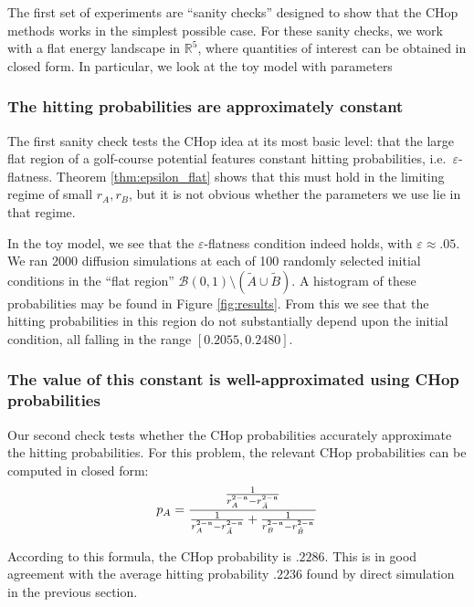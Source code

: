 \documentclass[english, aip, jcp, priprint, graphicx,floatfix]{revtex4-1}
\theoremstyle{plain}
\theoremstyle{definition}
\theoremstyle{plain}
\begin{document}
The first set of experiments are ``sanity checks'' designed to show that the CHop methods works in the simplest possible case.  For these sanity checks, we work with a flat energy landscape in $\mathbb{R}^5$, where quantities of interest can be obtained in closed form.  In particular, we look at the toy model with parameters \TODOTHIS

\subsubsection{The hitting probabilities are approximately constant}

The first sanity check tests the CHop idea at its most basic level: that the large flat region of a golf-course potential features constant hitting probabilities, i.e.\ $\varepsilon$-flatness.  Theorem \ref{thm:epsilon_flat} shows that this must hold in the limiting regime of small $r_A,r_B$, but it is not obvious whether the parameters we use lie in that regime.  

In the toy model, we see that the $\varepsilon$-flatness condition indeed holds, with $\varepsilon \approx .05$.  We ran 2000 diffusion simulations at each of 100 randomly selected initial conditions in the ``flat region'' $\mathcal{B}(0, 1) \setminus (\tilde{A} \cup \tilde{B})$.  A histogram of these probabilities may be found in Figure \ref{fig:results}.  From this we see that the hitting probabilities in this region do not substantially depend upon the initial condition, all falling in the range $[0.2055, 0.2480]$.


\subsubsection{The value of this constant is well-approximated using CHop probabilities}

Our second check tests whether the CHop probabilities accurately approximate the hitting probabilities.  For this problem, the relevant CHop probabilities can be computed in closed form:
\begin{equation}
p_A = \frac{\frac{1}{r_A^{2 - {\mathfrak{n}}} - r_{\tilde{A}}^{2 - {\mathfrak{n}}}}}{\frac{1}{r_A^{2 - {\mathfrak{n}}} - r_{\tilde{A}}^{2 - {\mathfrak{n}}}} + \frac{1}{r_B^{2 - {\mathfrak{n}}} - r_{\tilde{B}}^{2 - {\mathfrak{n}}}}}
\end{equation}

According to this formula, the CHop probability is $.2286$.  This is in good agreement with the average hitting probability $.2236$ found by direct simulation in the previous section.
\end{document}
